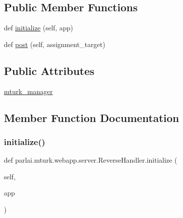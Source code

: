 \subsection*{Public Member Functions}
\begin{DoxyCompactItemize}
\item 
def \hyperlink{classparlai_1_1mturk_1_1webapp_1_1server_1_1ReverseHandler_a84a97cad4ff974d2765f02610941016c}{initialize} (self, app)
\item 
def \hyperlink{classparlai_1_1mturk_1_1webapp_1_1server_1_1ReverseHandler_a68457ba85cc4853cd5e1be1cbc05ca22}{post} (self, assignment\+\_\+target)
\end{DoxyCompactItemize}
\subsection*{Public Attributes}
\begin{DoxyCompactItemize}
\item 
\hyperlink{classparlai_1_1mturk_1_1webapp_1_1server_1_1ReverseHandler_a60664e4d71da9169afe68bd7b4f8a801}{mturk\+\_\+manager}
\end{DoxyCompactItemize}


\subsection{Member Function Documentation}
\mbox{\label{classparlai_1_1mturk_1_1webapp_1_1server_1_1ReverseHandler_a84a97cad4ff974d2765f02610941016c}} 
\subsubsection{\texorpdfstring{initialize()}{initialize()}}
{\footnotesize\ttfamily def parlai.\+mturk.\+webapp.\+server.\+Reverse\+Handler.\+initialize (\begin{DoxyParamCaption}\item[{}]{self,  }\item[{}]{app }\end{DoxyParamCaption})}

\mbox{\label{classparlai_1_1mturk_1_1webapp_1_1server_1_1ReverseHandler_a68457ba85cc4853cd5e1be1cbc05ca22}} 
